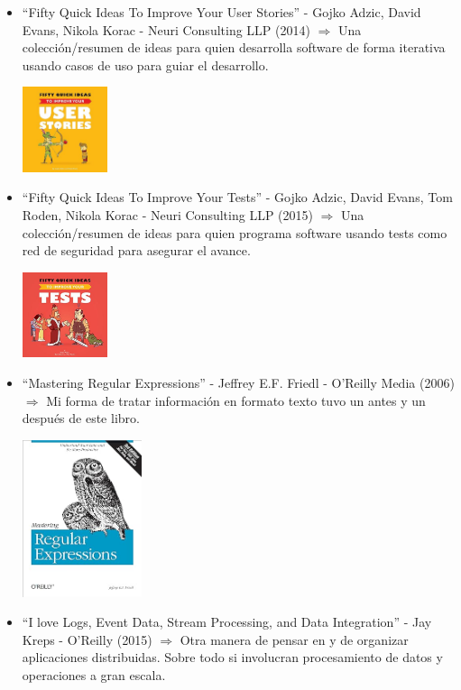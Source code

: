 \documentclass[spanish,12pt,a4paper,final,oneside]{book}
\begin{document}
\begin{itemize}
\item ``Fifty Quick Ideas To Improve Your User Stories''  - Gojko Adzic, David Evans, Nikola Korac - Neuri Consulting LLP (2014) $\Rightarrow$ Una colección/resumen de ideas para quien desarrolla software de forma iterativa usando casos de uso para guiar el desarrollo.

\includegraphics[width=2.5cm]{portada-FiftyQuickIdeasToImproveYourUserStories-.jpg} 

\item ``Fifty Quick Ideas To Improve Your Tests''  - Gojko Adzic, David Evans, Tom Roden, Nikola Korac - Neuri Consulting LLP (2015) $\Rightarrow$ Una colección/resumen de ideas para quien programa software usando tests como red de seguridad para asegurar el avance.

\includegraphics[width=2.5cm]{portada-FiftyQuickIdeasToImproveYourTests-.jpg} 

\item ``Mastering Regular Expressions'' - Jeffrey E.F. Friedl - O'Reilly Media (2006) $\Rightarrow$ Mi forma de tratar información en formato texto tuvo un antes y un después de este libro.

\includegraphics[width=3.5cm]{portada-MasteringReguarExpressions-JeffreyEFFriedl.jpg} 

\item ``I love Logs, Event Data, Stream Processing, and Data Integration'' - Jay Kreps - O'Reilly (2015) $\Rightarrow$ Otra manera de pensar en y de organizar aplicaciones distribuidas. Sobre todo si involucran procesamiento de datos y operaciones a gran escala.


\end{itemize}
\end{document}
